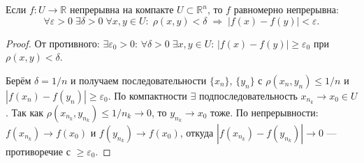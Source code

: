 \begin{theorem}
  Если $f: U \to \mathbb{R}$ непрерывна на компакте $U \subset \mathbb{R}^n$,
  то $f$ равномерно непрерывна:
  \[
    \forall\varepsilon>0\;\exists\delta>0\;\forall x,y\in U:\; \rho(x,y)<\delta
    \;\Rightarrow\; |f(x)-f(y)|<\varepsilon.
  \]
  \begin{proof}
    От противного: $\exists\varepsilon_0>0$: $\forall\delta>0\;\exists x,y\in U$:
    $|f(x)-f(y)|\geq\varepsilon_0$ при $\rho(x,y) < \delta$.

    Берём $\delta = 1/n$ и получаем последовательности $\{x_n\}$, $\{y_n\}$ с $\rho(x_n,y_n) \leq 1/n$
    и $|f(x_n)-f(y_n)|\geq\varepsilon_0$.
    По компактности $\exists$ подпоследовательность $x_{n_k} \to x_0 \in U$.
    Так как $\rho(x_{n_k}, y_{n_k}) \leq 1/n_k \to 0$, то $y_{n_k} \to x_0$ тоже.
    По непрерывности: $f(x_{n_k}) \to f(x_0)$ и $f(y_{n_k}) \to f(x_0)$,
    откуда $|f(x_{n_k})-f(y_{n_k})|\to 0$ --- противоречие с $\geq\varepsilon_0$. \qedhere
  \end{proof}
\end{theorem}

